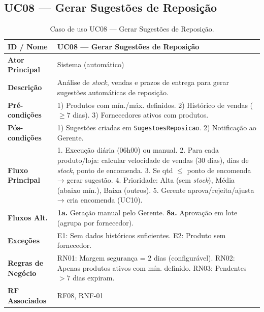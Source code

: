 \documentclass[a4paper,12pt]{scrreprt}
\begin{document}
\subsection*{UC08 --- Gerar Sugestões de Reposição}
\begin{table}[H]
\centering\small
\begin{tabular}{|p{3cm}|p{11cm}|}
\hline
\textbf{ID / Nome} & UC08 --- Gerar Sugestões de Reposição \\
\hline
\textbf{Ator Principal} & Sistema (automático) \\
\hline
\textbf{Descrição} & Análise de \textit{stock}, vendas e prazos de entrega para gerar sugestões automáticas de reposição. \\
\hline
\textbf{Pré-condições} & 1) Produtos com mín./máx. definidos. 2) Histórico de vendas ($\geq 7$ dias). 3) Fornecedores ativos com produtos. \\
\hline
\textbf{Pós-condições} & 1) Sugestões criadas em \texttt{SugestoesReposicao}. 2) Notificação ao Gerente. \\
\hline
\textbf{Fluxo Principal} & 1. Execução diária (06h00) ou manual. 2. Para cada produto/loja: calcular velocidade de vendas (30 dias), dias de \textit{stock}, ponto de encomenda. 3. Se qtd $\leq$ ponto de encomenda → gerar sugestão. 4. Prioridade: Alta (sem \textit{stock}), Média (abaixo mín.), Baixa (outros). 5. Gerente aprova/rejeita/ajusta → cria encomenda (UC10). \\
\hline
\textbf{Fluxos Alt.} & \textbf{1a.} Geração manual pelo Gerente. \textbf{8a.} Aprovação em lote (agrupa por fornecedor). \\
\hline
\textbf{Exceções} & E1: Sem dados históricos suficientes. E2: Produto sem fornecedor. \\
\hline
\textbf{Regras de Negócio} & RN01: Margem segurança = 2 dias (configurável). RN02: Apenas produtos ativos com mín. definido. RN03: Pendentes $> 7$ dias expiram. \\
\hline
\textbf{RF Associados} & RF08, RNF-01 \\
\hline
\end{tabular}
\caption{Caso de uso UC08 --- Gerar Sugestões de Reposição.}
\end{table}

\end{document}
